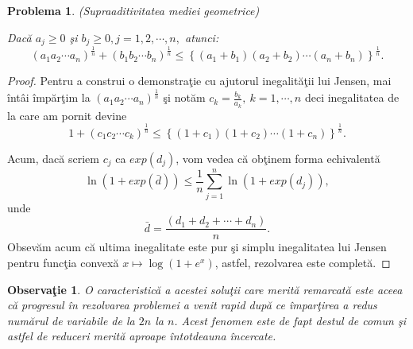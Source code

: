 \documentclass[a4paper,12pt,oneside]{report}
\newtheorem{problem}{Problema}
\newtheorem{remark}{Observa\c{t}ie}
\begin{document}
\begin{problem} (Supraaditivitatea mediei geometrice)

Dac\u{a} \(a_{j}\geq 0 \) \c{s}i \(b_{j}\geq 0, j = 1 , 2, \cdots, n,\) atunci:
\begin{displaymath}
  \left ( a_{1}a_{2}\cdots a_{n} \right )^{\frac{1}{n}} + \left ( b_{1}b_{2}\cdots b_{n} \right )^{\frac{1}{n}} \leq  \left \{ \left ( a_{1} + b_{1}\right ) \left ( a_{2} + b_{2} \right )\cdots \left ( a_{n} + b_{n} \right )\right \}^{\frac{1}{n}}.
\end{displaymath}
\end{problem}
  \begin{proof}
  Pentru a construi o demonstra\c{t}ie cu ajutorul inegalit\u{a}\c{t}ii lui Jensen, mai \^{i}nt\^{a}i \^{i}mp\u{a}r\c{t}im la
\(\left ( a_{1}a_{2}\cdots a_{n} \right )^{\frac{1}{n}}\) \c{s}i not\u{a}m \(c_{k}=\frac{b_{k}}{a_{k}},~k=1,\cdots, n\) deci inegalitatea de la care am pornit devine
\begin{displaymath}
  1 + \left ( c_{1}c_{2} \cdots c_{k}\right )^{\frac{1}{n}}\leq \left \{ \left ( 1 + c_{1} \right )\left ( 1 + c_{2} \right )\cdots \left ( 1 + c_{n} \right ) \right \}^{\frac{1}{n}}.
\end{displaymath}

Acum, dac\u{a} scriem \(c_{j}\) ca \(exp\left (d _{j} \right )\), vom vedea c\u{a} ob\c{t}inem forma echivalent\u{a}
\begin{displaymath}
  \ln\left ( 1 + exp\left ( \bar{d} \right ) \right ) \leq \frac{1}{n}\sum_{j = 1}^{n}\ln\left ( 1 + exp\left ( d_{j} \right ) \right ),
\end{displaymath}
unde
\begin{displaymath}
  \bar{d} = \frac{\left ( d_{1} + d_{2}  + \cdots + d_{n}\right )}{n}.
\end{displaymath}
Obsev\u{a}m acum c\u{a} ultima inegalitate este pur \c{s}i simplu inegalitatea lui Jensen pentru func\c{t}ia convex\u{a} \(x \mapsto \log \left ( 1 + e^{x} \right )\), astfel, rezolvarea este complet\u{a}.
\end{proof}
\begin{remark}
O caracteristic\u{a} a acestei solu\c{t}ii care merit\u{a} remarcat\u{a} este aceea c\u{a} progresul \^{i}n rezolvarea problemei a venit rapid dup\u{a} ce \^{i}mpar\c{t}irea a redus num\u{a}rul de variabile de la \(2n\) la \(n\). Acest fenomen este de fapt destul de comun \c{s}i astfel de reduceri merit\u{a} aproape \^{i}ntotdeauna \^{i}ncercate.
\end{remark}
\end{document}
